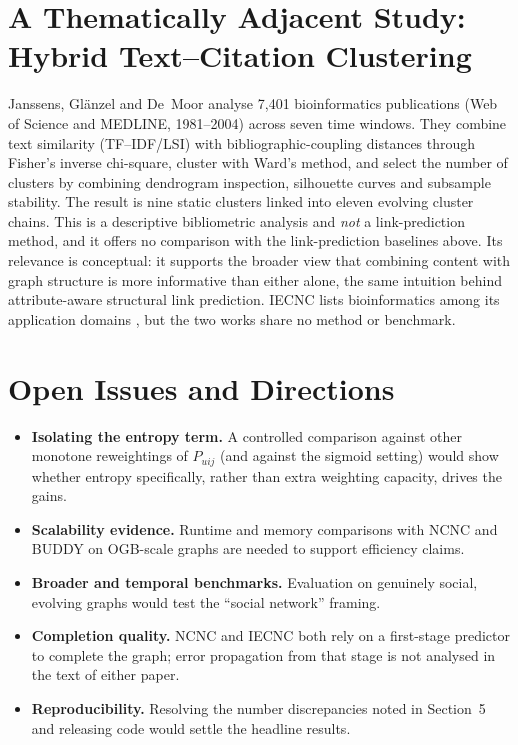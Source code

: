 \documentclass[11pt,a4paper]{article}
\begin{document}
\section{A Thematically Adjacent Study: Hybrid Text--Citation Clustering}
Janssens, Gl\"anzel and De~Moor \cite{janssens2007} analyse 7{,}401 bioinformatics publications
(Web of Science and MEDLINE, 1981--2004) across seven time windows. They combine text similarity
(TF--IDF/LSI) with bibliographic-coupling distances through Fisher's inverse chi-square, cluster with Ward's
method, and select the number of clusters by combining dendrogram inspection, silhouette curves and
subsample stability. The result is nine static clusters linked into eleven evolving cluster chains.
This is a descriptive bibliometric analysis and \emph{not} a link-prediction method, and
it offers no comparison with the link-prediction baselines above. Its relevance is conceptual: it
supports the broader view that combining content with graph structure is more informative than either
alone, the same intuition behind attribute-aware structural link prediction. IECNC lists bioinformatics
among its application domains \cite{zhou2025iecnc}, but the two works share no method or benchmark.

\section{Open Issues and Directions}
\begin{itemize}[leftmargin=1.5em,itemsep=0.2em]
  \item \textbf{Isolating the entropy term.} A controlled comparison against other monotone reweightings of $P_{uij}$ (and against the sigmoid setting)
        would show whether entropy specifically, rather than extra weighting capacity, drives the gains.
  \item \textbf{Scalability evidence.} Runtime and memory comparisons with NCNC and BUDDY on OGB-scale graphs are needed to support efficiency claims.
  \item \textbf{Broader and temporal benchmarks.} Evaluation on genuinely social, evolving graphs would test the ``social network'' framing.
  \item \textbf{Completion quality.} NCNC and IECNC both rely on a first-stage predictor to complete the graph; error propagation from that stage is not analysed in the text of either paper.
  \item \textbf{Reproducibility.} Resolving the number discrepancies noted in Section~5 and releasing code would settle the headline results.
\end{itemize}
\end{document}
